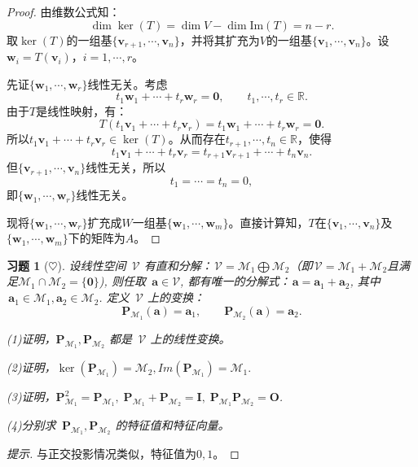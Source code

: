 \documentclass[UTF8]{ctexart}
\renewcommand{\Im}{{\mathrm{Im}}}
\newtheorem{ex}[thm]{习题}
\begin{document}
\begin{proof}
由维数公式知：$$\dim \ker(T)=\dim V-\dim \Im(T)=n-r.$$
取$\ker(T)$的一组基$\{\mathbf{v}_{r+1},\cdots, \mathbf{v}_n\}$，并将其扩充为$V$的一组基$\{\mathbf{v}_{1},\cdots, \mathbf{v}_n\}$。设$\mathbf{w}_i=T(\mathbf{v}_i)$，$i=1,\cdots,r$。

先证$\{\mathbf{w}_1,\cdots,\mathbf{w}_r\}$线性无关。考虑
$$t_1\mathbf{w}_1+\cdots+t_r\mathbf{w}_r=\mathbf{0},\qquad t_1,\cdots,t_r\in \mathbb{R}.$$	
由于$T$是线性映射，有：
$$T(t_1\mathbf{v}_1+\cdots+t_r\mathbf{v}_r)=t_1\mathbf{w}_1+\cdots+t_r\mathbf{w}_r=\mathbf{0}.$$		
所以$t_1\mathbf{v}_1+\cdots+t_r\mathbf{v}_r\in \ker (T)$。从而存在$t_{r+1},\cdots,t_{n}\in\mathbb{R}$，使得
$$t_1\mathbf{v}_1+\cdots+t_r\mathbf{v}_r= t_{r+1}\mathbf{v}_{r+1}+\cdots+t_n\mathbf{v}_n.$$
但$\{\mathbf{v}_{r+1},\cdots, \mathbf{v}_n\}$线性无关，所以
$$t_1=\cdots=t_n=0,$$
即$\{\mathbf{w}_1,\cdots,\mathbf{w}_r\}$线性无关。

现将$\{\mathbf{w}_1,\cdots,\mathbf{w}_r\}$扩充成$W$一组基$\{\mathbf{w}_1,\cdots,\mathbf{w}_m\}$。直接计算知，$T$在$\{\mathbf{v}_{1},\cdots, \mathbf{v}_n\}$及$\{\mathbf{w}_1,\cdots,\mathbf{w}_m\}$下的矩阵为$A$。
\end{proof}

	
	
\begin{ex}[$\heartsuit $]
	设线性空间 $\,\mathcal{V}$ 有直和分解：$\,\mathcal{V} = \mathcal{M}_1 \bigoplus \mathcal{M}_2$（即$\,\mathcal{V} = \mathcal{M}_1 + \mathcal{M}_2$且满足$\mathcal{M}_1 \cap \mathcal{M}_2=\{\boldsymbol{0}\}$), 则任取 $\,\boldsymbol{a} \in \mathcal{V}$, 都有唯一的分解式：$\,\boldsymbol{a} = \boldsymbol{a}_1 + \boldsymbol{a}_2$, 其中 $\,\boldsymbol{a}_1 \in \mathcal{M}_1, \boldsymbol{a}_2 \in \mathcal{M}_2$. 定义 $\,\mathcal{V}$ 上的变换：
	$$ 
	\boldsymbol{P}_{\mathcal{M}_1}(\boldsymbol{a}) = \boldsymbol{a}_1, \qquad \boldsymbol{P}_{\mathcal{M}_2}(\boldsymbol{a}) = \boldsymbol{a}_2.
	$$
	
	(1)证明，$\boldsymbol{P}_{\mathcal{M}_1}, \boldsymbol{P}_{\mathcal{M}_2}$ 都是 $\,\mathcal{V}$ 上的线性变换。
	
	(2)证明，$\ker(\boldsymbol{P}_{\mathcal{M}_1}) = \mathcal{M}_2, Im(\boldsymbol{P}_{\mathcal{M}_1}) = \mathcal{M}_1.$
	
	(3)证明，$\boldsymbol{P}_{\mathcal{M}_1}^2 = \boldsymbol{P}_{\mathcal{M}_1},\; \boldsymbol{P}_{\mathcal{M}_1} + \boldsymbol{P}_{\mathcal{M}_2} = \boldsymbol{I},\; \boldsymbol{P}_{\mathcal{M}_1}\boldsymbol{P}_{\mathcal{M}_2} = \boldsymbol{O}$.
	
	(4)分别求 $\,\boldsymbol{P}_{\mathcal{M}_1}, \boldsymbol{P}_{\mathcal{M}_2}$ 的特征值和特征向量。
\end{ex}
\begin{proof}[提示]
与正交投影情况类似，特征值为$0,1$。
\end{proof}
\end{document}
